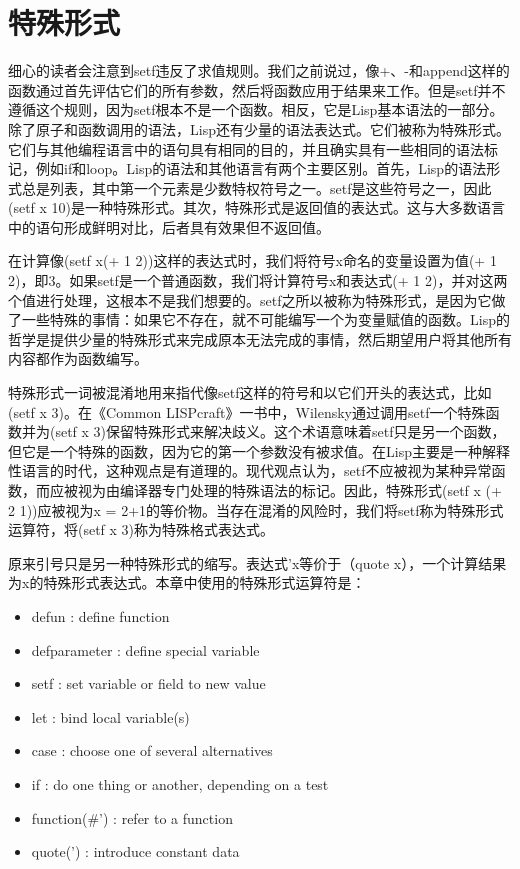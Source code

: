 \section{特殊形式}
细心的读者会注意到setf违反了求值规则。我们之前说过，像+、-和append这样的函数通过首先评估它们的所有参数，然后将函数应用于结果来工作。但是setf并不遵循这个规则，因为setf根本不是一个函数。相反，它是Lisp基本语法的一部分。除了原子和函数调用的语法，Lisp还有少量的语法表达式。它们被称为特殊形式。它们与其他编程语言中的语句具有相同的目的，并且确实具有一些相同的语法标记，例如if和loop。Lisp的语法和其他语言有两个主要区别。首先，Lisp的语法形式总是列表，其中第一个元素是少数特权符号之一。setf是这些符号之一，因此(setf x 10)是一种特殊形式。其次，特殊形式是返回值的表达式。这与大多数语言中的语句形成鲜明对比，后者具有效果但不返回值。

在计算像(setf x(+ 1 2))这样的表达式时，我们将符号x命名的变量设置为值(+ 1 2)，即3。如果setf是一个普通函数，我们将计算符号x和表达式(+ 1 2)，并对这两个值进行处理，这根本不是我们想要的。setf之所以被称为特殊形式，是因为它做了一些特殊的事情：如果它不存在，就不可能编写一个为变量赋值的函数。Lisp的哲学是提供少量的特殊形式来完成原本无法完成的事情，然后期望用户将其他所有内容都作为函数编写。

特殊形式一词被混淆地用来指代像setf这样的符号和以它们开头的表达式，比如(setf x 3)。在《Common LISPcraft》一书中，Wilensky通过调用setf一个特殊函数并为(setf x 3)保留特殊形式来解决歧义。这个术语意味着setf只是另一个函数，但它是一个特殊的函数，因为它的第一个参数没有被求值。在Lisp主要是一种解释性语言的时代，这种观点是有道理的。现代观点认为，setf不应被视为某种异常函数，而应被视为由编译器专门处理的特殊语法的标记。因此，特殊形式(setf x (+ 2 1))应被视为x = 2+1的等价物。当存在混淆的风险时，我们将setf称为特殊形式运算符，将(setf x 3)称为特殊格式表达式。

原来引号只是另一种特殊形式的缩写。表达式'x等价于（quote x），一个计算结果为x的特殊形式表达式。本章中使用的特殊形式运算符是：
\begin{itemize}
	\item defun : define function
	\item defparameter : define special variable
	\item setf : set variable or field to new value
	\item let : bind local variable(s)
	\item case : choose one of several alternatives
	\item if : do one thing or another, depending on a test
	\item function(\#') : refer to a function
	\item quote(') : introduce constant data
\end{itemize}